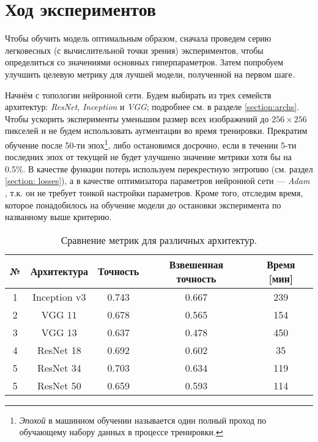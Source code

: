 \section{Ход экспериментов}

\indent
\indent
Чтобы обучить модель оптимальным образом, сначала проведем серию
легковесных (с вычислительной точки зрения) экспериментов, чтобы определиться 
со значениями основных гиперпараметров. Затем попробуем улучшить целевую метрику
для лучшей модели, полученной на первом шаге.

\indent
\indent
Начнём с топологии нейронной сети. Будем выбирать из трех семейств архитектур:
 \textit{ResNet}, \textit{Inception} и \textit{VGG}; подробнее см. в разделе \ref{section:archs}.
Чтобы ускорить эксперименты уменьшим размер всех изображений до
$256 \times 256$ пикселей и не будем использовать аугментации во время тренировки.
Прекратим обучение после 50-ти
эпох\footnote{\textit{Эпохой} в машинном обучении называется один полный проход по
обучающему набору данных в процессе тренировки.}, либо остановимся досрочно,
если в течении 5-ти последних эпох от текущей не будет улучшено 
значение метрики хотя бы на 0.5\%. В качестве функции потерь используем
 перекрестную энтропию (см. раздел \ref{section: losses}),
 а в качестве оптимизатора параметров 
нейронной сети --- \textit{Adam} \cite{adam}, т.к. он не требует тонкой настройки
параметров. Кроме того, отследим время, которое 
понадобилось на обучение модели до остановки эксперимента 
по названному выше критерию.


\begin{table}[h]
    \begin{center}
        \begin{tabular}{c | c| c | c | c}
            \hline
            № & Архитектура & Точность & Взвешенная точность  & Время [мин] \\
            \hline
    
            1 & Inception v3 & 0.743 & 0.667 & 239 \\
            
            2 & VGG 11 & 0.678 & 0.565 & 154 \\
            
            3 & VGG 13 & 0.637 & 0.478 & 450 \\
            
            4 & ResNet 18 & 0.692 & 0.602 & 35 \\
            
            5 & ResNet 34 & 0.703 & 0.634 & 119 \\
            
            5 & ResNet 50 & 0.659 & 0.593 & 114 \\
    
            \hline
        \end{tabular}
    \end{center}
    \caption{Сравнение метрик для различных архитектур.}
    \label{tabular: arch_compare}
\end{table}


